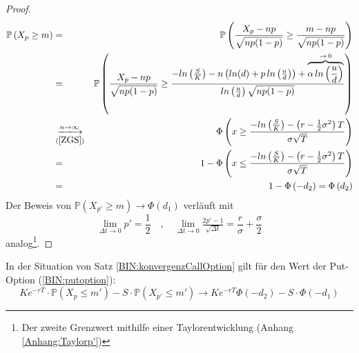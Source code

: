 \begin{proof}
\begin{eqnarray*}
\mathbb{P} \left( X_p \geq m \right) & = & \mathbb{P} \left( \frac{X_p - np}{\sqrt{np(1-p)}} \geq \frac{m - np}{\sqrt{np(1-p)}} \right) \\
                                     & = & \mathbb{P} \left( \frac{X_p - np}{\sqrt{np(1-p)}} \geq \frac{-ln\left(\frac{S}{K}\right) - n\left(ln(d) + p\,ln\left(\frac{u}{d}\right)\right) + \overbrace{\alpha\,ln\left(\frac{u}{d}\right)}^{\to\,  0}}{ln\left(\frac{u}{d}\right)\sqrt{np(1-p)}}\right) \\
                                     & \underset{(\ref{ZGS})}{\xlongrightarrow{n \to \infty}} &\Phi \left( x \geq \frac{-ln\left(\frac{S}{K}\right) - \left(r-\frac{1}{2}\sigma^2\right)T}{\sigma\sqrt{T}} \right) \\
                                     & = & 1 - \Phi \left( x \leq \frac{-ln\left(\frac{S}{K}\right) - \left(r-\frac{1}{2}\sigma^2\right)T}{\sigma\sqrt{T}} \right) \\
                                     & = & 1 - \Phi\left(-d_2\right) = \Phi\left(d_2\right)
\end{eqnarray*}
Der Beweis von $ \mathbb{P} \left( X_{p'} \geq m \right) \to \Phi\left(d_1\right) $ verläuft mit 
\begin{equation*}
\lim\limits_{\Delta t \to 0} p' = \frac{1}{2} \quad , \quad 
\lim\limits_{\Delta t \to 0} \tfrac{2p' - 1}{\sqrt{\Delta t}} = \frac{r}{\sigma} + \frac{\sigma}{2}
\end{equation*}
analog\footnote{Der zweite Grenzwert mithilfe einer Taylorentwicklung (Anhang \ref{Anhang:Taylorp'})}.

 

\end{proof}

\begin{satz} \label{BIN:konvergenzPutOption}
In der Situation von Satz \ref{BIN:konvergenzCallOption} gilt für den Wert der Put-Option (\ref{BIN:putoption}):
\[
Ke^{-rT} \cdot \mathbb{P}\left(X_{p} \leq m'\right)  - S \cdot \mathbb{P}\left(X_{p'} \leq m'\right) \longrightarrow Ke^{-rT} \Phi\left(-d_2\right)  - S \cdot \Phi\left(-d_1\right)
\]
\end{satz}

